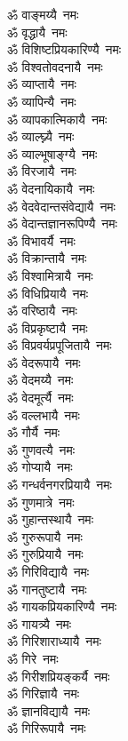 \begin{flushleft}
\begin{multicols}{2}
ॐ वाङ्मय्यै~नमः\\
ॐ वृद्धायै~नमः\\
ॐ विशिष्टप्रियकारिण्यै~नमः\\
ॐ विश्वतोवदनायै~नमः\\
ॐ व्याप्तायै~नमः\\
ॐ व्यापिन्यै~नमः\\
ॐ व्यापकात्मिकायै~नमः\\
ॐ व्याल्घ्न्यै~नमः\\
ॐ व्याल्भूषाङ्ग्यै~नमः\\
ॐ विरजायै~नमः\hfill{}\\
ॐ वेदनायिकायै~नमः\\
ॐ वेदवेदान्तसंवेद्यायै~नमः\\
ॐ वेदान्तज्ञानरूपिण्यै~नमः\\
ॐ विभावर्यै~नमः\\
ॐ विक्रान्तायै~नमः\\
ॐ विश्वामित्रायै~नमः\\
ॐ विधिप्रियायै~नमः\\
ॐ वरिष्ठायै~नमः\\
ॐ विप्रकृष्टायै~नमः\\
ॐ विप्रवर्यप्रपूजितायै~नमः\hfill{}\\
ॐ वेदरूपायै~नमः\\
ॐ वेदमय्यै~नमः\\
ॐ वेदमूर्त्यै~नमः\\
ॐ वल्लभायै~नमः\\
ॐ गौर्यै~नमः\\
ॐ गुणवत्यै~नमः\\
ॐ गोप्यायै~नमः\\
ॐ गन्धर्वनगरप्रियायै~नमः\\
ॐ गुणमात्रे~नमः\\
ॐ गुहान्तस्थायै~नमः\hfill{}\\
ॐ गुरुरूपायै~नमः\\
ॐ गुरुप्रियायै~नमः\\
ॐ गिरिविद्यायै~नमः\\
ॐ गानतुष्टायै~नमः\\
ॐ गायकप्रियकारिण्यै~नमः\\
ॐ गायत्र्यै~नमः\\
ॐ गिरिशाराध्यायै~नमः\\
ॐ गिरे~नमः\\
ॐ गिरीशप्रियङ्कर्यै~नमः\\
ॐ गिरिज्ञायै~नमः\hfill{}\\
ॐ ज्ञानविद्यायै~नमः\\
ॐ गिरिरूपायै~नमः\\

\end{multicols}
\end{flushleft}
